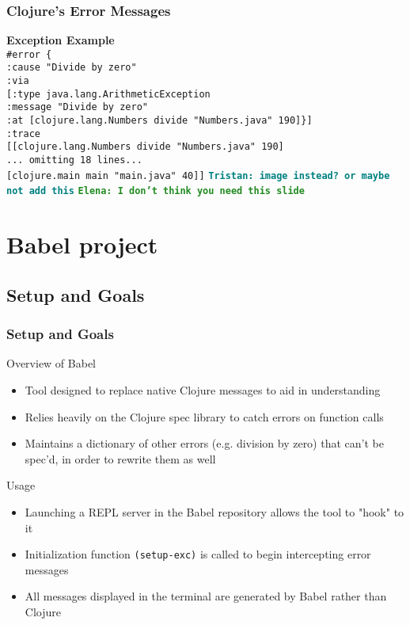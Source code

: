 \documentclass{beamer}
\newcommand{\comment}[1]{{\bf \tt  {#1}}}
\newcommand{\emcomment}[1]{\textcolor{ForestGreen}{\comment{Elena: {#1}}}}
\newcommand{\tkcomment}[1]{\textcolor{Teal}{\comment{Tristan: {#1}}}}
\begin{document}
\begin{frame}
  \frametitle{Clojure's Error Messages}
  \textbf{Exception Example} \\
  \texttt{\#error \{ } \\
  \texttt{:cause "Divide by zero"} \\
  \texttt{:via} \\
  \texttt{[{:type java.lang.ArithmeticException} } \\
  \texttt{:message "Divide by zero"} \\
  \texttt{:at [clojure.lang.Numbers divide "Numbers.java" 190]\}]} \\
  \texttt{:trace} \\
  \texttt{[[clojure.lang.Numbers divide "Numbers.java" 190]} \\
  \texttt{... omitting 18 lines...} \\
  \texttt{[clojure.main main "main.java" 40]]}
  \tkcomment{image instead? or maybe not add this}
\emcomment{I don't think you need this slide}
\end{frame}

\section{Babel project}

\subsection{Setup and Goals}
\begin{frame}
    \frametitle{Setup and Goals}
    Overview of Babel
    \begin{itemize}
        \item Tool designed to replace native Clojure messages to aid in understanding
        \item Relies heavily on the Clojure spec library to catch errors on function calls
        \item Maintains a dictionary of other errors (e.g. division by zero) that can't be spec'd, in order to rewrite them as well
    \end{itemize}
    Usage
    \begin{itemize}
        \item Launching a REPL server in the Babel repository allows the tool to "hook" to it
        \item Initialization function \texttt{(setup-exc)} is called to begin intercepting error messages
        \item All messages displayed in the terminal are generated by Babel rather than Clojure
    \end{itemize}
\end{frame}
\end{document}
